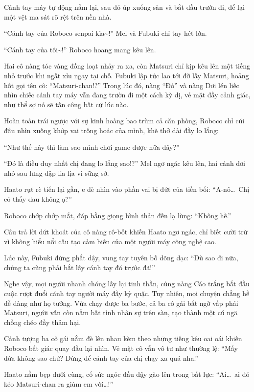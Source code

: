 \documentclass[../main.tex]{subfiles}
\begin{document}
Cánh tay máy tự động nắm lại, sau đó úp xuống sàn và bắt đầu trườn đi, để lại một vệt ma sát rõ rệt trên nền nhà.


``Cánh tay của Roboco-senpai kìa\~{}!'' Mel và Fubuki chỉ tay hét lớn.

``Cánh tay của tôi\~{}!'' Roboco hoang mang kêu lên.

Hai cô nàng tóc vàng đồng loạt nhảy ra xa, còn Matsuri chỉ kịp kêu lên một tiếng nhỏ trước khi ngất xỉu ngay tại chỗ. Fubuki lập tức lao tới đỡ lấy Matsuri, hoảng hốt gọi tên cô: ``Matsuri-chan!?'' Trong lúc đó, nàng ``Đỏ'' và nàng Dơi lén liếc nhìn chiếc cánh tay máy vẫn đang trườn đi một cách kỳ dị, vẻ mặt đầy cảnh giác, như thể sợ nó sẽ tấn công bất cứ lúc nào.

Hoàn toàn trái ngược với sự kinh hoàng bao trùm cả căn phòng, Roboco chỉ cúi đầu nhìn xuống khớp vai trống hoác của mình, khẽ thở dài đầy lo lắng:

``Như thế này thì làm sao mình chơi game được nữa đây?''

``Đó là điều duy nhất chị đang lo lắng sao!?'' Mel ngơ ngác kêu lên, hai cánh dơi nhỏ sau lưng đập lia lịa vì sững sờ.

Haato rụt rè tiến lại gần, e dè nhìn vào phần vai bị đứt của tiền bối: ``A-nô\dots\ Chị có thấy đau không ạ?''

Roboco chớp chớp mắt, đáp bằng giọng bình thản đến lạ lùng: ``Không hề.''

Câu trả lời dứt khoát của cô nàng rô-bốt khiến Haato ngơ ngác, chỉ biết cười trừ vì không hiểu nổi cấu tạo cảm biến của một người máy công nghệ cao.

Lúc này, Fubuki đứng phắt dậy, vung tay tuyên bố dõng dạc: ``Dù sao đi nữa, chúng ta cũng phải bắt lấy cánh tay đó trước đã!''

Nghe vậy, mọi người nhanh chóng lấy lại tinh thần, cùng nàng Cáo trắng bắt đầu cuộc rượt đuổi cánh tay người máy đầy kỳ quặc. Tuy nhiên, mọi chuyện chẳng hề dễ dàng như họ tưởng. Vừa chạy được ba bước, cả ba cô gái bất ngờ vấp phải Matsuri, người vẫn còn nằm bất tỉnh nhân sự trên sàn, tạo thành một cú ngã chồng chéo đầy thảm hại.


Cảnh tượng ba cô gái nằm đè lên nhau kèm theo những tiếng kêu oai oái khiến Roboco bất giác quay đầu lại nhìn. Vẻ mặt cô vẫn vô tư như thường lệ: ``Mấy đứa không sao chứ? Đừng để cánh tay của chị chạy xa quá nha.''

Haato nằm bẹp dưới cùng, cố sức ngóc đầu dậy gào lên trong bất lực: ``Ai\dots\ ai đó kéo Matsuri-chan ra giùm em với\dots!''
\end{document}

